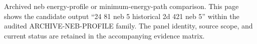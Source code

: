 Archived neb energy-profile or minimum-energy-path comparison. This page shows the candidate output ``24 81 neb 5 historical 2d 421 neb 5'' within the audited ARCHIVE-NEB-PROFILE family. The panel identity, source scope, and current status are retained in the accompanying evidence matrix.
